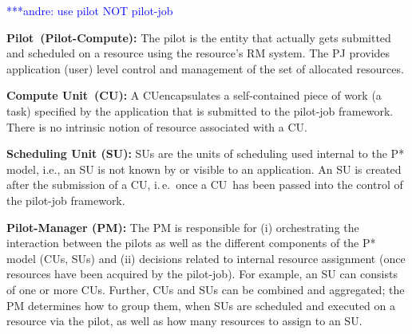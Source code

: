 \documentclass[conference,final]{IEEEtran}
\makeatletter
\def\blueuwave{\bgroup \markoverwith{\lower3.5\p@\hbox{\sixly \textcolor{blue}{\char58}}}\ULon}
\newcommand{\alwave}[1]{ {\blueuwave{#1}}}
\newcommand{\alnote}[1]{ {\textcolor{blue} { ***andre: #1 }}}
\newcommand{\alnote}[1]{}
\newcommand{\pilot}{Pilot}
\newcommand{\computeunit}{Compute Unit}
\newcommand{\cu}{CU}
\makeatother
\begin{document}
\alnote{use pilot NOT pilot-job}
\begin{compactitem}
\item \textbf{\pilot \ (Pilot-Compute):} The pilot is the
  entity that actually gets submitted and scheduled on a resource
  using the resource's RM system. The PJ provides application (user)
  level control and management of the set of allocated resources.



\item \textbf{\computeunit \ (\cu):} A \cu encapsulates a self-contained
  piece of work (a task) specified by the application that is
  submitted to the pilot-job framework.  There is no intrinsic notion
  of resource associated with a \cu.

\item \textbf{Scheduling Unit (SU):} SUs are the units of scheduling
  used internal to the P* model, i.e., an SU is not known by or
  visible to an application. An SU is created after the submission of
  a \cu, i.\,e.\ once a \cu \ has been passed into the control of the
  pilot-job framework.

\item \textbf{Pilot-Manager (PM):} The PM is responsible for (i)
  orchestrating the interaction between the pilots as well as the
  different components of the P* model (\cu s, SUs) and (ii) decisions
  related to internal resource assignment (once resources have been
  acquired by the pilot-job).  For example, an SU can consists of one
  or more \cu s. Further, \cu s and SUs can be combined and aggregated;
  the PM determines how to group them, when SUs are scheduled and
  executed on a resource via the pilot, as well as how many resources
  to assign to an SU.



\end{compactitem}
\end{document}
